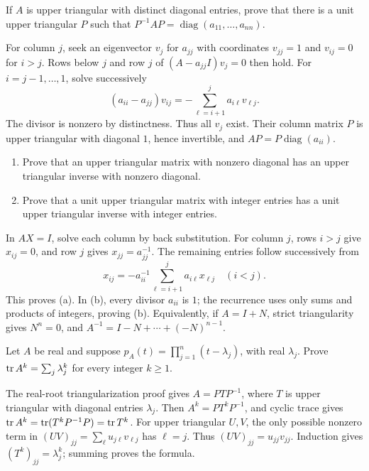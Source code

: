 \begin{problem}\label{ex:08:unit-triangular}
If \(A\) is upper triangular with distinct diagonal entries, prove that
there is a unit upper triangular \(P\) such that
\(P^{-1}AP=\operatorname{diag}(a_{11},\ldots,a_{nn})\).
\end{problem}
\begin{solution}
For column \(j\), seek an eigenvector \(v_j\) for \(a_{jj}\) with
coordinates \(v_{jj}=1\) and \(v_{ij}=0\) for \(i>j\).
Rows below \(j\) and row \(j\) of \((A-a_{jj}I)v_j=0\) then hold.
For \(i=j-1,\ldots,1\), solve successively
\[
 (a_{ii}-a_{jj})v_{ij}=-\sum_{\ell=i+1}^{j}a_{i\ell}v_{\ell j}.
\]
The divisor is nonzero by distinctness. Thus all \(v_j\) exist.
Their column matrix \(P\) is upper triangular with diagonal \(1\), hence
invertible, and \(AP=P\operatorname{diag}(a_{ii})\).
\end{solution}

\begin{problem}\label{ex:08:triangular-inverse}
\begin{enumerate}
\item Prove that an upper triangular matrix with nonzero diagonal has an
upper triangular inverse with nonzero diagonal.
\item Prove that a unit upper triangular matrix with integer entries has
a unit upper triangular inverse with integer entries.
\end{enumerate}
\end{problem}
\begin{solution}
In \(AX=I\), solve each column by back substitution.
For column \(j\), rows \(i>j\) give \(x_{ij}=0\), and row \(j\) gives
\(x_{jj}=a_{jj}^{-1}\). The remaining entries follow successively from
\[
 x_{ij}=-a_{ii}^{-1}\sum_{\ell=i+1}^j a_{i\ell}x_{\ell j}
 \quad(i<j).
\]
This proves (a). In (b), every divisor \(a_{ii}\) is \(1\);
the recurrence uses only sums and products of integers, proving (b).
Equivalently, if \(A=I+N\), strict triangularity gives \(N^n=0\), and
\(A^{-1}=I-N+\cdots+(-N)^{n-1}\).
\end{solution}

\begin{problem}\label{ex:08:trace-powers}
Let \(A\) be real and suppose
\(p_A(t)=\prod_{j=1}^n(t-\lambda_j)\), with real \(\lambda_j\).
Prove
\(\operatorname{tr} A^k=\sum_j\lambda_j^k\) for every integer \(k\geqslant1\).
\end{problem}
\begin{solution}
The real-root triangularization proof gives \(A=PTP^{-1}\),
where \(T\) is upper triangular with diagonal entries \(\lambda_j\).
Then \(A^k=PT^kP^{-1}\), and cyclic trace gives
\(\operatorname{tr} A^k=\operatorname{tr}(T^kP^{-1}P)=\operatorname{tr} T^k\).
For upper triangular \(U,V\), the only possible nonzero term in
\((UV)_{jj}=\sum_\ell u_{j\ell}v_{\ell j}\) has \(\ell=j\).
Thus \((UV)_{jj}=u_{jj}v_{jj}\). Induction gives
\((T^k)_{jj}=\lambda_j^k\); summing proves the formula.
\end{solution}

